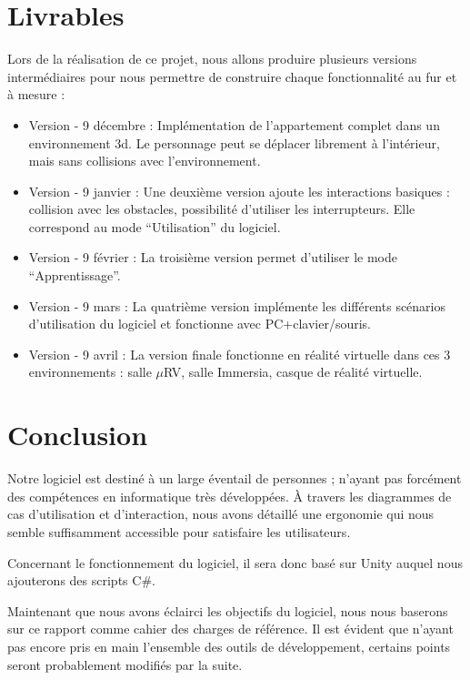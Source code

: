 \section{Livrables}
Lors de la réalisation de ce projet, nous allons produire plusieurs versions intermédiaires pour nous permettre de construire chaque fonctionnalité au fur et à mesure :
\begin{itemize}
  \item Version  - 9 décembre : Implémentation de l'appartement complet dans un environnement 3d. Le personnage peut se déplacer librement à l'intérieur, mais sans collisions avec l'environnement.
  \item Version  - 9 janvier : Une deuxième version ajoute les interactions basiques : collision avec les obstacles, possibilité d'utiliser les interrupteurs. Elle correspond au mode \enquote{Utilisation} du logiciel.
  \item Version  - 9 février :  La troisième version permet d'utiliser le mode \enquote{Apprentissage}.
  \item Version  - 9 mars : La quatrième version implémente les différents scénarios d'utilisation du logiciel et fonctionne avec PC+clavier/souris.
  \item Version  - 9 avril : La version finale fonctionne en réalité virtuelle dans ces 3 environnements : salle $\mu$RV, salle Immersia, casque de réalité virtuelle.
\end{itemize}


\section{Conclusion}
Notre logiciel est destiné à un large éventail de personnes ; n'ayant pas forcément des compétences en informatique très développées.
\`A travers les diagrammes de cas d'utilisation et d'interaction, nous avons détaillé une ergonomie qui nous semble suffisamment accessible pour satisfaire les utilisateurs.

Concernant le fonctionnement du logiciel, il sera donc basé sur Unity auquel nous ajouterons des scripts C\#.

Maintenant que nous avons éclairci les objectifs du logiciel, nous nous baserons sur ce rapport comme cahier des charges de référence. Il est évident que n'ayant pas encore pris en main l'ensemble des outils de développement, certains points seront probablement modifiés par la suite.




